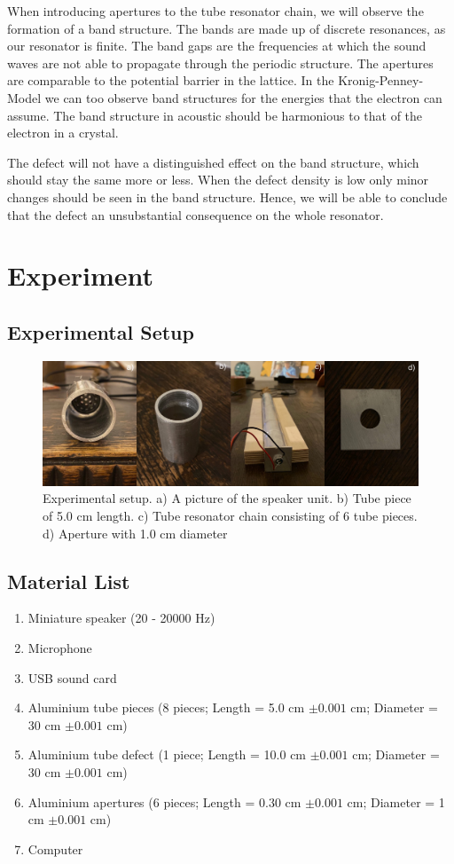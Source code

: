 \documentclass[12pt]{article}
\begin{document}
When introducing apertures to the tube resonator chain, we will observe the formation of a band structure. The bands are made up of discrete resonances, as our resonator is finite. The band gaps are the frequencies at which the sound waves are not able to propagate through the periodic structure. The apertures are comparable to the potential barrier in the lattice. In the Kronig-Penney-Model we can too observe band structures for the energies that the electron can assume. The band structure in acoustic should be harmonious to that of the electron in a crystal.

The defect will not have a distinguished effect on the band structure, which should stay the same more or less. When the defect density is low only minor changes should be seen in the band structure. Hence, we will be able to conclude that the defect an unsubstantial consequence on the whole resonator. 
\section{Experiment}
\subsection{Experimental Setup}
\begin{figure}[hbt]
	\caption{Experimental setup. a) A picture of the speaker unit. b) Tube piece of 5.0 cm length. c) Tube resonator chain consisting of 6 tube pieces. d) Aperture with 1.0 cm diameter}
	\includegraphics[width=.8\textwidth]{introduction/experimental_setup}	
\end{figure}
\subsection{Material List}
\begin{enumerate}
	\item Miniature speaker (20 - 20000 Hz)
	\item Microphone
	\item USB sound card
	\item Aluminium tube pieces (8 pieces; Length = 5.0 cm $\pm 0.001$ cm; Diameter = 30 cm $\pm 0.001$ cm)
	\item Aluminium tube defect (1 piece; Length = 10.0 cm $\pm 0.001$ cm; Diameter = 30 cm $\pm 0.001$ cm)
	\item Aluminium apertures (6 pieces; Length = 0.30 cm $\pm 0.001$ cm; Diameter = 1 cm $\pm 0.001$ cm)
	\item Computer
\end{enumerate}
\end{document}
